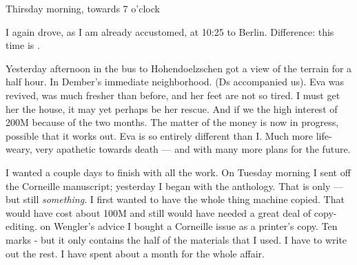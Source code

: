 Thirsday morning, towards 7 o'clock

I again drove, as I am already accustomed, at 10:25 to Berlin. Difference: this time is .

Yesterday afternoon in the bus to Hohendoelzschen got a view of the terrain  for a half hour. In Dember's immediate neighborhood. (Ds accompanied us). Eva was revived, was much fresher than before, and her feet are not so tired. I must get her the house, it may yet perhaps be her rescue. And if we  the high interest of 200M because of the two months. The matter of the money is now in progress, possible that it works out.
Eva is so entirely different than I. Much more life-weary, very apathetic towards death — and with many more plans for the future.

I wanted a couple days to finish with all the work. On Tuesday morning I sent off the Corneille manuscript; yesterday I began with the anthology. That is only  — but still \textit{something}. I first wanted to have the whole thing machine copied. That would have cost about 100M and still would have needed a great deal of copy-editing. on Wengler's advice I bought a Corneille issue as a printer's copy. Ten marks - but it only contains the half of the materials that I used. I have to write out the rest. I have spent about a month for the whole affair.